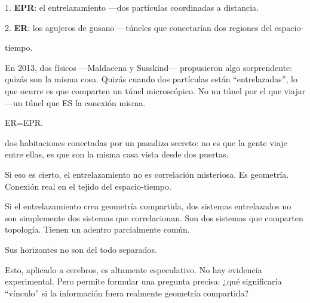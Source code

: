 1. \textbf{EPR}: el entrelazamiento —dos partículas coordinadas a distancia.

2. \textbf{ER}: los agujeros de gusano —túneles que conectarían dos regiones del espacio-

tiempo.

En 2013, dos físicos —Maldacena y Susskind— propusieron algo sorprendente: quizás son la misma cosa. Quizás cuando dos partículas están “entrelazadas”, lo que ocurre es que comparten un túnel microscópico. No un túnel por el que viajar —un túnel que ES la conexión misma.

\begin{fisica}
 ER=EPR.

 dos habitaciones conectadas por un pasadizo secreto: no es que la gente viaje entre ellas, es que son la misma casa vista desde dos puertas.
\end{fisica}
Si eso es cierto, el entrelazamiento no es correlación misteriosa. Es geometría. Conexión real en el tejido del espacio-tiempo.

\noindent Si el entrelazamiento crea geometría compartida, dos sistemas entrelazados no son simplemente dos sistemas que correlacionan. Son dos sistemas que comparten topología. Tienen un adentro parcialmente común.

Sus horizontes no son del todo separados.

Esto, aplicado a cerebros, es altamente especulativo. No hay evidencia experimental. Pero permite formular una pregunta precisa: ¿qué significaría “vínculo” si la información fuera realmente geometría compartida?

